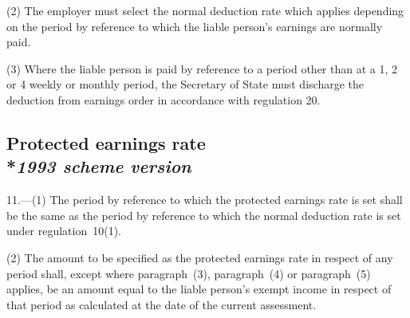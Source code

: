 \documentclass[12pt,a4paper]{article}
\begin{document}
(2) The employer must select the normal deduction rate which applies depending on the period by reference to which the liable person’s earnings are normally paid.

(3) Where the liable person is paid by reference to a period other than at a 1, 2 or 4 weekly or monthly period, the Secretary of State must discharge the deduction from earnings order in accordance with regulation 20.


\subsection[11. Protected earnings rate --- \emph{1993 scheme version}]{Protected earnings rate\\*\emph{1993 scheme version}}

11.—(1) The period by reference to which the protected earnings rate is set shall be the same as the period by reference to which the normal deduction rate is set under regulation~10(1).

(2) The amount to be specified as the protected earnings rate in respect of any period shall, except where 
paragraph~(3), paragraph~(4) or paragraph~(5)  %
applies,  %
be an amount equal to the liable person’s exempt income in respect of that period as calculated at the date of the current assessment.
\end{document}
